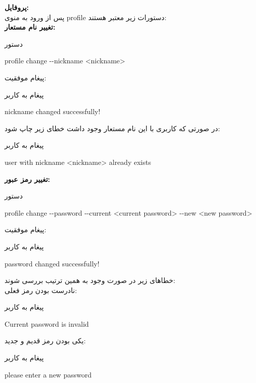 \documentclass[]{article}
\begin{document}
\vspace{.5cm}
\textbf{پروفایل:}
\\
پس از ورود به منوی profile دستورات زیر معتبر هستند:
\\
\vspace{.5cm}
\textbf{تغییر نام مستعار:}
\begin{mybox}[colback=yellow]{دستور}
	\begin{latin}	
		profile change -{}-nickname <nickname>
	\end{latin}
\end{mybox}
پیغام موفقیت:
\begin{mybox}[colback=yellow]{پیغام به کاربر}
	\begin{latin}	
		nickname changed successfully!
	\end{latin}
\end{mybox}
در صورتی که کاربری با این نام مستعار وجود داشت خطای زیر چاپ شود:
\begin{mybox}[colback=yellow]{پیغام به کاربر}
	\begin{latin}	
		user with nickname <nickname> already exists
	\end{latin}
\end{mybox}

\vspace{.5cm}
\textbf{تغییر رمز عبور:}
\begin{mybox}[colback=yellow]{دستور}
	\begin{latin}	
		profile change -{}-password -{}-current <current password> -{}-new <new 
		password>
	\end{latin}
\end{mybox}
پیغام موفقیت:
\begin{mybox}[colback=yellow]{پیغام به کاربر}
	\begin{latin}	
		password changed successfully!
	\end{latin}
\end{mybox}
خطا‌های زیر در صورت وجود به همین ترتیب بررسی شوند:
\\
نادرست بودن رمز فعلی:
\begin{mybox}[colback=yellow]{پیغام به کاربر}
	\begin{latin}	
		Current password is invalid
	\end{latin}
\end{mybox}
یکی بودن رمز قدیم و جدید:
\begin{mybox}[colback=yellow]{پیغام به کاربر}
	\begin{latin}	
		please enter a new password
	\end{latin}
\end{mybox}
\end{document}
